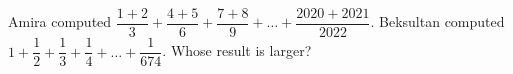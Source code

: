 Amira computed $\dfrac{1+2}{3}+\dfrac{4+5}{6}+\dfrac{7+8}{9}+\ldots+\dfrac{2020+2021}{2022}$. Beksultan computed $1+\dfrac{1}{2}+\dfrac{1}{3}+\dfrac{1}{4}+\ldots+\dfrac{1}{674}$. Whose result is larger?
